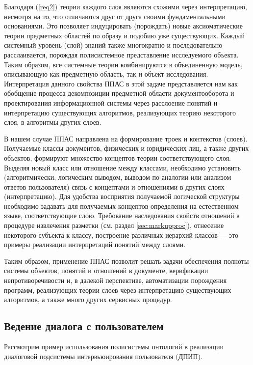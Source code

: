 \documentclass[utf8]{../IncArticle}
\begin{document}
Благодаря (\ref{req2}) теории каждого слоя являются схожими через
интерпретацию, несмотря на то, что отличаются друг от друга своими
фундаментальными основаниями.  Это позволяет индуцировать (порождать)
новые аксиоматические теории предметных областей по образу и подобию
уже существующих.  Каждый системный уровень (слой) знаний также
многократно и последовательно расслаивается, порождая полисистемное
представление исследуемого объекта.  Таким образом, все системные
теории комбинируются в объединенную модель, описывающую как предметную
область, так и объект исследования.  Интерпретация данного свойства ППАС в
этой задаче представляется нам как обобщение процесса декомпозиции
предметной области документооборота и проектирования информационной
системы через расслоение понятий и интерпретацию существующих
алгоритмов, реализующих теорию некоторого слоя, в алгоритмы других
слоев.

В нашем случае ППАС направлена на формирование троек и контекстов
(слоев).  Получаемые классы документов, физических и юридических лиц,
а также других объектов, формируют множество концептов теории
соответствующего слоя.  Выделяя новый класс или отношение между
классами, необходимо установить (алгоритмически, логическим выводом,
выводом по аналогии или анализом ответов пользователя) связь с
концептами и отношениями в других слоях (интерпретацию).  Для удобства
восприятия получаемой логической структуры необходимо задавать
для получаемых концептов определения на естественном языке,
соответствующие слою.  Требование наследования свойств отношений в
процедуре извлечения разметки (см. раздел \ref{sec:markupproc}),
отнесение некоторого субъекта к классу, построение различных иерархий
классов --- это примеры реализации интерпретаций понятий между слоями.

Таким образом, применение ППАС позволит решать задачи обеспечения
полноты системы объектов, понятий и отношений в документе, верификации
непротиворечивости и, в далекой перспективе, автоматизации порождения
программ, реализующих теории слоев через интерпретацию существующих
алгоритмов, а также много других сервисных процедур.

\subsection{Ведение диалога с пользователем}

Рассмотрим пример использования полисистемы онтологий в реализации
диалоговой подсистемы интервьюирования пользователя (ДПИП).
\end{document}
